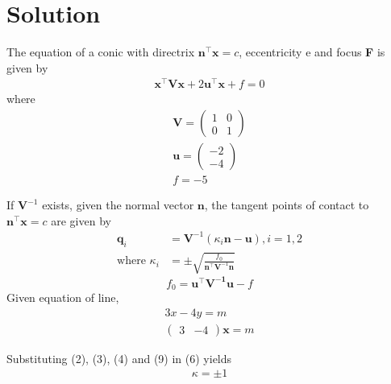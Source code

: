 \documentclass[journal,12pt,twocolumn]{IEEEtran}
\let\vec\mathbf
\providecommand{\brak}[1]{\ensuremath{\left(#1\right)}}
\begin{document}
\section{Solution}
\raggedright The equation of a conic with directrix $\vec{n}^\intercal\vec{x} = c$, eccentricity e and focus \textbf{F} is given by
\begin{align}
\vec{x}^{\top}\vec{V}\vec{x}+2\vec{u}^{\top}\vec{x}+f = 0 
\end{align}
where
\begin{align}
\vec{V} = \begin{pmatrix}
1 & 0\\
0 & 1
\end{pmatrix} \\
\vec{u} = \begin{pmatrix}
     -2 \\
     -4
    \end{pmatrix}  \\
f = -5  
\end{align}

If $\vec{V}^{-1}$ exists, given the normal vector $\vec{n}$, the tangent points of contact to $\vec{n}^\intercal\vec{x} = c$ are given by
\begin{align}
\vec{q}_i &= \vec{V}^{-1}\brak{\kappa_i \vec{n}-\vec{u}}, i = 1,2
\\
\text{where }\kappa_i &= \pm \sqrt{
\frac{
f_0
}
{
\vec{n}^{\top}\vec{V}^{-1}\vec{n}
}
}
\end{align}
\begin{equation}
f_0=\vec{u^\top} \vec{V^{-1}} \vec{u}-f
\end{equation}
Given equation of line,
\begin{align}
3x-4y=m \\
\begin{pmatrix}
3 & -4
\end{pmatrix}
\vec{x} = m  
\end{align}

Substituting (2), (3), (4) and (9) in (6) yields
\begin{align}
\kappa = \pm 1
\end{align}
\end{document}
